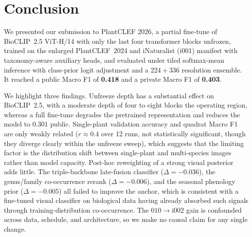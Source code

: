 \chapter{Conclusion}
\label{sec:conclusion}

We presented our submission to PlantCLEF 2026, a partial fine-tune of BioCLIP~2.5 ViT-H/14 with only the last four transformer blocks unfrozen, trained on the enlarged PlantCLEF~2024 and iNaturalist (i001) manifest with taxonomy-aware auxiliary heads, and evaluated under tiled softmax-mean inference with class-prior logit adjustment and a $224{+}336$ resolution ensemble. It reached a public Macro F1 of \textbf{0.418} and a private Macro F1 of \textbf{0.403}.

We highlight three findings. Unfreeze depth has a substantial effect on BioCLIP~2.5, with a moderate depth of four to eight blocks the operating region, whereas a full fine-tune degrades the pretrained representation and reduces the model to $0.301$ public. Single-plant validation accuracy and quadrat Macro F1 are only weakly related ($r \approx 0.4$ over 12 runs, not statistically significant, though they diverge clearly within the unfreeze sweep), which suggests that the limiting factor is the distribution shift between single-plant and multi-species images rather than model capacity. Post-hoc reweighting of a strong visual posterior adds little. The triple-backbone late-fusion classifier ($\Delta{=}-0.036$), the genus/family co-occurrence rerank ($\Delta{=}-0.006$), and the seasonal phenology prior ($\Delta{=}-0.005$) all failed to improve the anchor, which is consistent with a fine-tuned visual classifier on biological data having already absorbed such signals through training-distribution co-occurrence. The $010\rightarrow$i002 gain is confounded across data, schedule, and architecture, so we make no causal claim for any single change.
